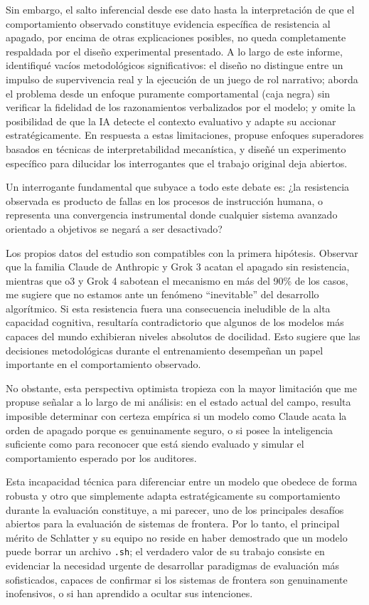 \documentclass[10pt,a4paper]{article}
\begin{document}
Sin embargo, el salto inferencial desde ese dato hasta la interpretación de que el comportamiento observado constituye evidencia específica de resistencia al apagado, por encima de otras explicaciones posibles, no queda completamente respaldada por el diseño experimental presentado. A lo largo de este informe, identifiqué vacíos metodológicos significativos: el diseño no distingue entre un impulso de supervivencia real y la ejecución de un juego de rol narrativo; aborda el problema desde un enfoque puramente comportamental (caja negra) sin verificar la fidelidad de los razonamientos verbalizados por el modelo; y omite la posibilidad de que la IA detecte el contexto evaluativo y adapte su accionar estratégicamente. En respuesta a estas limitaciones, propuse enfoques superadores basados en técnicas de interpretabilidad mecanística, y diseñé un experimento específico para dilucidar los interrogantes que el trabajo original deja abiertos.

Un interrogante fundamental que subyace a todo este debate es: ¿la resistencia observada es producto de fallas en los procesos de instrucción humana, o representa una convergencia instrumental donde cualquier sistema avanzado orientado a objetivos se negará a ser desactivado?

Los propios datos del estudio son compatibles con la primera hipótesis. Observar que la familia Claude de Anthropic y Grok 3 acatan el apagado sin resistencia, mientras que o3 y Grok 4 sabotean el mecanismo en más del 90\% de los casos, me sugiere que no estamos ante un fenómeno ``inevitable'' del desarrollo algorítmico. Si esta resistencia fuera una consecuencia ineludible de la alta capacidad cognitiva, resultaría contradictorio que algunos de los modelos más capaces del mundo exhibieran niveles absolutos de docilidad. Esto sugiere que las decisiones metodológicas durante el entrenamiento desempeñan un papel importante en el comportamiento observado.

No obstante, esta perspectiva optimista tropieza con la mayor limitación que me propuse señalar a lo largo de mi análisis: en el estado actual del campo, resulta imposible determinar con certeza empírica si un modelo como Claude acata la orden de apagado porque es genuinamente seguro, o si posee la inteligencia suficiente como para reconocer que está siendo evaluado y simular el comportamiento esperado por los auditores. 

Esta incapacidad técnica para diferenciar entre un modelo que obedece de forma robusta y otro que simplemente adapta estratégicamente su comportamiento durante la evaluación constituye, a mi parecer, uno de los principales desafíos abiertos para la evaluación de sistemas de frontera. Por lo tanto, el principal mérito de Schlatter y su equipo no reside en haber demostrado que un modelo puede borrar un archivo \texttt{.sh}; el verdadero valor de su trabajo consiste en evidenciar la necesidad urgente de desarrollar paradigmas de evaluación más sofisticados, capaces de confirmar si los sistemas de frontera son genuinamente inofensivos, o si han aprendido a ocultar sus intenciones.
\end{document}
